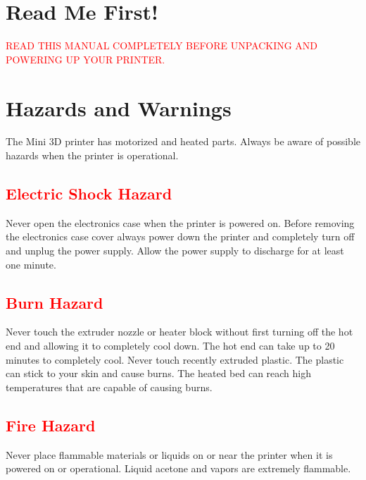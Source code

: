 %
%
%
%
%

\section{Read Me First!}
\textcolor{red}{READ THIS MANUAL COMPLETELY BEFORE UNPACKING AND POWERING UP YOUR PRINTER.}

\section{Hazards and Warnings}

The Mini 3D printer has motorized and heated parts.  Always be aware of possible hazards when the printer is operational.

\subsection{\textcolor{red}{Electric Shock Hazard}}
Never open the electronics case when the printer is powered on. Before removing the electronics case cover always power down the printer and completely turn off and unplug the power supply. Allow the power supply to discharge for at least one minute.

\subsection{\textcolor{red}{Burn Hazard}}
Never touch the extruder nozzle or heater block without first turning off the hot end and allowing it to completely cool down. The hot end can take up to 20 minutes to completely cool. Never touch recently extruded plastic. The plastic can stick to your skin and cause burns. The heated bed can reach high temperatures that are capable of causing burns.

\subsection{\textcolor{red}{Fire Hazard}}
Never place flammable materials or liquids on or near the printer when it is powered on or operational. Liquid acetone and vapors are extremely flammable.

